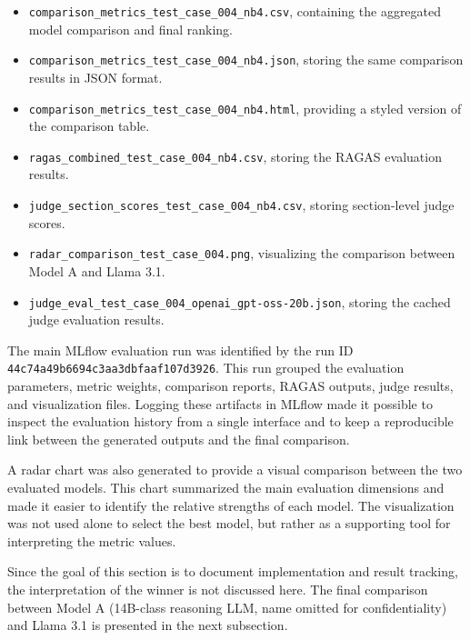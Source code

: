 \begin{itemize}
    \item \texttt{comparison\_metrics\_test\_case\_004\_nb4.csv}, containing the aggregated model comparison and final ranking.
    
    \item \texttt{comparison\_metrics\_test\_case\_004\_nb4.json}, storing the same comparison results in JSON format.
    
    \item \texttt{comparison\_metrics\_test\_case\_004\_nb4.html}, providing a styled version of the comparison table.
    
    \item \texttt{ragas\_combined\_test\_case\_004\_nb4.csv}, storing the RAGAS evaluation results.
    
    \item \texttt{judge\_section\_scores\_test\_case\_004\_nb4.csv}, storing section-level judge scores.
    
    \item \texttt{radar\_comparison\_test\_case\_004.png}, visualizing the comparison between Model A and Llama 3.1.
    
    \item \texttt{judge\_eval\_test\_case\_004\_openai\_gpt-oss-20b.json}, storing the cached judge evaluation results.
\end{itemize}

The main MLflow evaluation run was identified by the run ID \texttt{44c74a49b6694c3aa3dbfaaf107d3926}. This run grouped the evaluation parameters, metric weights, comparison reports, RAGAS outputs, judge results, and visualization files. Logging these artifacts in MLflow made it possible to inspect the evaluation history from a single interface and to keep a reproducible link between the generated outputs and the final comparison.

A radar chart was also generated to provide a visual comparison between the two evaluated models. This chart summarized the main evaluation dimensions and made it easier to identify the relative strengths of each model. The visualization was not used alone to select the best model, but rather as a supporting tool for interpreting the metric values.

Since the goal of this section is to document implementation and result tracking, the interpretation of the winner is not discussed here. The final comparison between Model A (14B-class reasoning LLM, name omitted for confidentiality) and Llama 3.1 is presented in the next subsection.

